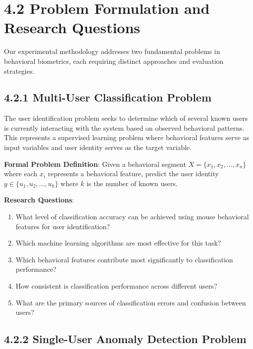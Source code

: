 \documentclass[
  12pt,
  a4paper,
]{report}
\providecommand{\tightlist}{%
  \setlength{\itemsep}{0pt}\setlength{\parskip}{0pt}}
\begin{document}
\section{4.2 Problem Formulation and Research
Questions}\label{problem-formulation-and-research-questions}

Our experimental methodology addresses two fundamental problems in
behavioral biometrics, each requiring distinct approaches and evaluation
strategies.

\subsection{4.2.1 Multi-User Classification
Problem}\label{multi-user-classification-problem}

The user identification problem seeks to determine which of several
known users is currently interacting with the system based on observed
behavioral patterns. This represents a supervised learning problem where
behavioral features serve as input variables and user identity serves as
the target variable.

\textbf{Formal Problem Definition}: Given a behavioral segment
\(X = \{x_1, x_2, ..., x_n\}\) where each \(x_i\) represents a
behavioral feature, predict the user identity
\(y \in \{u_1, u_2, ..., u_k\}\) where \(k\) is the number of known
users.

\textbf{Research Questions}:

\begin{enumerate}
\def\labelenumi{\arabic{enumi}.}
\tightlist
\item
  What level of classification accuracy can be achieved using mouse
  behavioral features for user identification?
\item
  Which machine learning algorithms are most effective for this task?
\item
  Which behavioral features contribute most significantly to
  classification performance?
\item
  How consistent is classification performance across different users?
\item
  What are the primary sources of classification errors and confusion
  between users?
\end{enumerate}

\subsection{4.2.2 Single-User Anomaly Detection
Problem}\label{single-user-anomaly-detection-problem}
\end{document}
